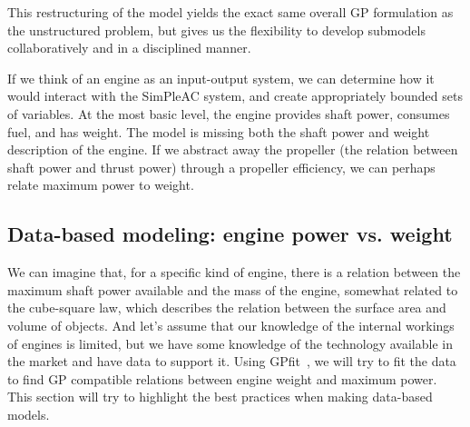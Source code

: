 This restructuring of the model yields the exact same overall \gls{GP} formulation
as the unstructured problem, but gives us the flexibility to develop submodels
collaboratively and in a disciplined manner.

If we think of an engine as an input-output system, we can determine how it
would interact with the SimPleAC system, and create appropriately bounded
sets of variables.
At the most basic level, the engine provides shaft power, consumes fuel,
and has weight. The model is missing both the shaft power and weight description
of the engine. If we abstract away the propeller (the relation between shaft
power and thrust power) through a propeller efficiency,
we can perhaps relate maximum power to weight.

\subsection{Data-based modeling: engine power vs. weight}
\label{s:datafit}

We can imagine that, for a specific kind of engine, there is a relation between the
maximum shaft power available and the mass of the engine, somewhat related to the
cube-square law, which describes the relation between the surface area and volume
of objects. And let's assume that our knowledge of the internal workings of engines
is limited, but we have some knowledge of the technology available in the market
and have data to support it. Using GPfit~\cite{gpfitpaper}, we will try to fit the data to find
\gls{GP} compatible relations between engine weight and maximum power. This section
will try to highlight the best practices when making data-based models.

